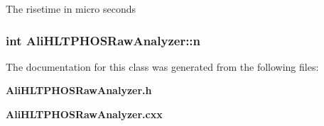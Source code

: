 The risetime in micro seconds 
\subsubsection{\setlength{\rightskip}{0pt plus 5cm}int {\bf Ali\-HLTPHOSRaw\-Analyzer::n}\hspace{0.3cm}{\tt  [protected]}}\label{classAliHLTPHOSRawAnalyzer_p5}




The documentation for this class was generated from the following files:\begin{CompactItemize}
\item 
{\bf Ali\-HLTPHOSRaw\-Analyzer.h}\item 
{\bf Ali\-HLTPHOSRaw\-Analyzer.cxx}\end{CompactItemize}
